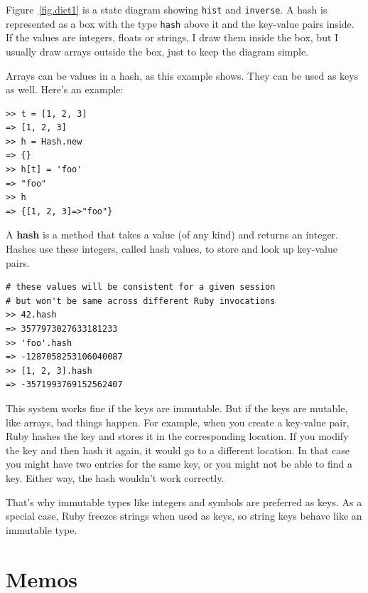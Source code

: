 \documentclass[10pt]{book}
\begin{document}
Figure~\ref{fig.dict1} is a state diagram showing {\tt hist} and {\tt inverse}.
A hash is represented as a box with the type {\tt hash} above it
and the key-value pairs inside.  If the values are integers, floats or
strings, I draw them inside the box, but I usually draw arrays
outside the box, just to keep the diagram simple.

Arrays can be values in a hash, as this example shows. They
can be used as keys as well.  Here's an example:

\begin{verbatim}
>> t = [1, 2, 3]
=> [1, 2, 3]
>> h = Hash.new
=> {}
>> h[t] = 'foo'
=> "foo"
>> h
=> {[1, 2, 3]=>"foo"}
\end{verbatim}
%
A {\bf hash} is a method that takes a value (of any kind)
and returns an integer.  Hashes use these integers,
called hash values, to store and look up key-value pairs.

\begin{verbatim}
# these values will be consistent for a given session
# but won't be same across different Ruby invocations
>> 42.hash
=> 3577973027633181233
>> 'foo'.hash
=> -1287058253106040087
>> [1, 2, 3].hash
=> -3571993769152562407
\end{verbatim}

This system works fine if the keys are immutable.  But if the
keys are mutable, like arrays, bad things happen.  For example,
when you create a key-value pair, Ruby hashes the key and 
stores it in the corresponding location.  If you modify the
key and then hash it again, it would go to a different location.
In that case you might have two entries for the same key,
or you might not be able to find a key.  Either way, the
hash wouldn't work correctly.

That's why immutable types like integers and symbols are preferred
as keys. As a special case, Ruby freezes strings when used as keys,
so string keys behave like an immutable type.



\section{Memos}
\label{memoize}
\end{document}
